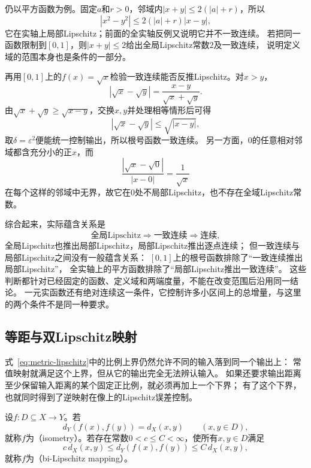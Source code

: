 仍以平方函数为例。固定$a$和$r>0$，邻域内$|x+y|\leq2(|a|+r)$，所以
\[
  |x^2-y^2|\leq 2(|a|+r)|x-y|,
\]
它在实轴上局部Lipschitz；前面的全实轴反例又说明它并不一致连续。
若把同一函数限制到$[0,1]$，则$|x+y|\leq2$给出全局Lipschitz常数$2$及一致连续，
说明定义域的范围本身也是条件的一部分。

再用$[0,1]$上的$f(x)=\sqrt x$检验一致连续能否反推Lipschitz。对$x>y$，
\[
  |\sqrt x-\sqrt y|=\frac{x-y}{\sqrt x+\sqrt y}.
\]
由$\sqrt x+\sqrt y\geq\sqrt{x-y}$，交换$x,y$并处理相等情形后可得
\[
  |\sqrt x-\sqrt y|\leq\sqrt{|x-y|},
\]
取$\delta=\varepsilon^2$便能统一控制输出，所以根号函数一致连续。
另一方面，$0$的任意相对邻域都含充分小的正$x$，而
\[
  \frac{|\sqrt x-\sqrt0|}{|x-0|}=\frac1{\sqrt x}
\]
在每个这样的邻域中无界，故它在$0$处不局部Lipschitz，也不存在全域Lipschitz常数。

综合起来，实际蕴含关系是
\[
  \text{全局Lipschitz}\Longrightarrow\text{一致连续}\Longrightarrow\text{连续},
\]
全局Lipschitz也推出局部Lipschitz，局部Lipschitz推出逐点连续；
但一致连续与局部Lipschitz之间没有一般蕴含关系：
$[0,1]$上的根号函数排除了“一致连续推出局部Lipschitz”，
全实轴上的平方函数排除了“局部Lipschitz推出一致连续”。
这些判断都针对已经固定的函数、定义域和两端度量，不能在改变范围后沿用同一结论。
一元实函数还有绝对连续这一条件，它控制许多小区间上的总增量，与这里的两个条件不是同一种要求。

\subsection{等距与双Lipschitz映射}
\label{sec:metric-isometry-bilipschitz}

式~\eqref{eq:metric-lipschitz}中的比例上界仍然允许不同的输入落到同一个输出上：
常值映射就满足这个上界，但从它的输出完全无法辨认输入。
如果还要求输出距离至少保留输入距离的某个固定正比例，就必须再加上一个下界；
有了这个下界，也就同时得到了逆映射在像上的Lipschitz误差控制。

\begin{definition}[等距映射与双Lipschitz映射]
\label{def:metric-isometry-bilipschitz}
设$f:D\subseteq X\to Y$。若
\[
  d_Y(f(x),f(y))=d_X(x,y)\qquad(x,y\in D),
\]
就称$f$为（isometry）。若存在常数$0<c\leq C<\infty$，使所有$x,y\in D$满足
\begin{equation}
\label{eq:metric-bilipschitz}
  c\,d_X(x,y)\leq d_Y(f(x),f(y))\leq C\,d_X(x,y),
\end{equation}
就称$f$为（bi-Lipschitz mapping）。
\end{definition}

